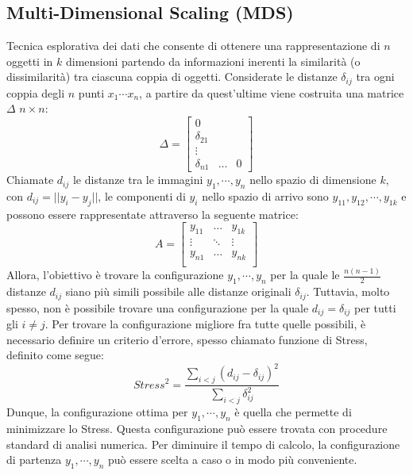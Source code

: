 \documentclass[11pt,a4paper,twocolumn]{article}
\begin{document}
\subsection{Multi-Dimensional Scaling (MDS)}
Tecnica esplorativa dei dati che consente di ottenere una rappresentazione di $n$ oggetti in $k$ dimensioni partendo da informazioni inerenti la similarità (o dissimilarità) tra  ciascuna coppia di oggetti. Considerate le distanze $ \delta_{ij} $ tra ogni coppia degli $n$ punti $x_1 \cdots x_n$, a partire da quest'ultime viene costruita una matrice $\Delta$ $n \times n$:
\begin{equation}
\nonumber
\Delta=\begin{bmatrix}
0\\
\delta_{21}  \\
\vdots   \\
\delta_{n1} & \dots & 0
\end{bmatrix}
\end{equation}
Chiamate $d_{ij}$ le distanze tra le immagini $ y_{1},\cdots,y_{n}$ nello spazio di dimensione $k$, con $d_{ij}=\lvert\lvert{y_i-y_j}\lvert\lvert$, le componenti di $y_i$ nello spazio di arrivo sono $y_{11},y_{12},\cdots,y_{1k}$ e possono essere rappresentate attraverso la seguente matrice:
\begin{equation}
\nonumber
A = \begin{bmatrix}
y_{11}           & \dots         & y_{1k}         \\
\vdots   &  \ddots    & \vdots \\
y_{n1}          & \dots         & y_{nk}         \\
\end{bmatrix}
\end{equation}
Allora, l'obiettivo è trovare la configurazione $y_{1},\cdots,y_{n}$ per la quale le $\frac{n(n-1)}{2}$ distanze $d_{ij}$ siano più simili possibile alle distanze originali $\delta_{ij}$. Tuttavia, molto spesso, non è possibile trovare una configurazione per la quale $d_{ij} = \delta_{ij}$ per tutti gli $i \neq j$. Per trovare la configurazione migliore fra tutte quelle possibili, è necessario definire un criterio d'errore, spesso chiamato funzione di Stress, definito come segue:
\begin{equation}
\nonumber
Stress^2=\frac{\sum_{i<j}{(d_{ij}-\delta_{ij})^2}}{\sum_{i<j}{\delta_{ij}^2}}
\end{equation}
Dunque, la configurazione ottima per $y_1,\cdots,y_n$ è quella che permette di minimizzare lo Stress. Questa configurazione può essere trovata con  procedure standard di analisi numerica. Per diminuire il tempo di calcolo, la configurazione di partenza $y_1,\cdots,y_n$ può essere scelta a caso o in  modo più conveniente.
\end{document}
